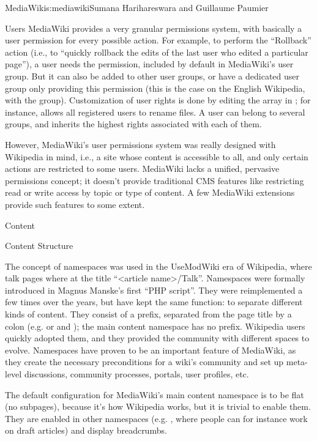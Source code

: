 \begin{aosachapter}{MediaWiki}{s:mediawiki}{Sumana Harihareswara and Guillaume Paumier}
\begin{aosasect1}{Users}
MediaWiki provides a very granular permissions system, with basically
a user permission for every possible action. For example, to perform
the ``Rollback'' action (i.e., to ``quickly rollback the edits of the last
user who edited a particular page''), a user needs the 
permission, included by default in MediaWiki's  user
group. But it can also be added to other user groups, or have a
dedicated user group only providing this permission (this is the case
on the English Wikipedia, with the 
group). Customization of user rights is done by editing the
 array in ; for
instance, 
allows all registered users to rename files. A user can belong to
several groups, and inherits the highest rights associated with each
of them.

However, MediaWiki's user permissions system was really designed with
Wikipedia in mind, i.e., a site whose content is accessible to all, and
only certain actions are restricted to some users. MediaWiki lacks a
unified, pervasive permissions concept; it doesn't provide traditional
CMS features like restricting read or write access by topic or type of
content. A few MediaWiki extensions provide such features to some
extent.

\end{aosasect1}

\begin{aosasect1}{Content}

\begin{aosasect2}{Content Structure}

The concept of namespaces was used in the UseModWiki era of Wikipedia,
where talk pages where at the title ``{\textless}article
name{\textgreater}/Talk''. Namespaces were formally introduced in
Magnus Manske's first ``PHP script''. They were reimplemented a few
times over the years, but have kept the same function: to separate
different kinds of content. They consist of a prefix, separated from
the page title by a colon (e.g.  or  and
); the main content namespace has no prefix. Wikipedia
users quickly adopted them, and they provided the community with
different spaces to evolve. Namespaces have proven to be an important
feature of MediaWiki, as they create the necessary preconditions for a
wiki's community and set up meta-level discussions, community
processes, portals, user profiles, etc.

The default configuration for MediaWiki's main content namespace is to
be flat (no subpages), because it's how Wikipedia works, but it is
trivial to enable them. They are enabled in other namespaces
(e.g. , where people can for instance work on draft
articles) and display breadcrumbs.


\end{aosasect2}
\end{aosasect1}
\end{aosachapter}
